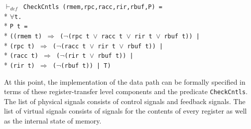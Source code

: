 \begin{normalsize}
\hspace*{\fill}
\begin{minipage}{17cm}$\vdash_{def}$\verb" CheckCntls (rmem,rpc,racc,rir,rbuf,P) ="\\*
$\forall$\verb"t."\\*
\verb"P t ="\\*
\verb"((rmem t) "$\Rightarrow$\verb" ("$\neg$\verb"(rpc t "$\vee$\verb" racc t "$\vee$\verb" rir t "$\vee$\verb" rbuf t)) |"\\*
\verb"(rpc t) "$\Rightarrow$\verb" ("$\neg$\verb"(racc t "$\vee$\verb" rir t "$\vee$\verb" rbuf t)) |"\\*
\verb"(racc t) "$\Rightarrow$\verb" ("$\neg$\verb"(rir t "$\vee$\verb" rbuf t)) |"\\*
\verb"(rir t) "$\Rightarrow$\verb" ("$\neg$\verb"(rbuf t)) | T)"
\end{minipage}
\hspace*{\fill}

At this point, the implementation of the data path can be formally
specified in terms of these register-transfer level components and
the predicate \verb"CheckCntls".
The list of physical signals consists of control signals and feedback signals.
The list of virtual signals consists of signals for the contents of
every register as well as the internal state of memory.


\end{normalsize}
